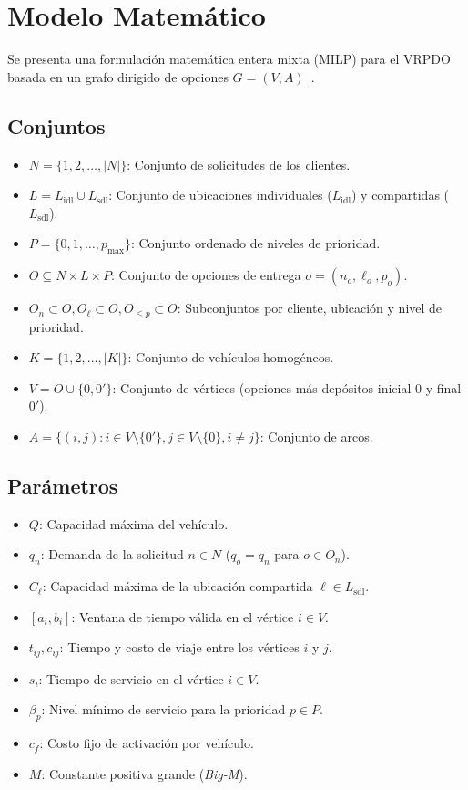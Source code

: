 \documentclass[letter, 10pt]{article}
\begin{document}
\section{Modelo Matemático} 
Se presenta una formulación matemática entera mixta (MILP) para el VRPDO basada en un grafo dirigido de opciones $G=(V, A)$~\cite{Dumez21Large, Tilk21LastMile, Yang25Neighborhood}. \subsection{Conjuntos} 
\begin{itemize} 
    \item $N = \{1, 2, \dots, |N|\}$: Conjunto de solicitudes de los clientes. \item $L = L_{\text{idl}} \cup L_{\text{sdl}}$: Conjunto de ubicaciones individuales ($L_{\text{idl}}$) y compartidas ($L_{\text{sdl}}$). 
    \item $P = \{0, 1, \dots, p_{\max}\}$: Conjunto ordenado de niveles de prioridad. 
    \item $O \subseteq N \times L \times P$: Conjunto de opciones de entrega $o = (n_o, \ell_o, p_o)$. 
    \item $O_n \subset O, O_\ell \subset O, O_{\le p} \subset O$: Subconjuntos por cliente, ubicación y nivel de prioridad. 
    \item $K = \{1, 2, \dots, |K|\}$: Conjunto de vehículos homogéneos. 
    \item $V = O \cup \{0, 0'\}$: Conjunto de vértices (opciones más depósitos inicial $0$ y final $0'$). 
    \item $A = \{(i, j) : i \in V \setminus \{0'\}, j \in V \setminus \{0\}, i \neq j\}$: Conjunto de arcos.
\end{itemize} 

\subsection{Parámetros} 
\begin{itemize} 
    \item $Q$: Capacidad máxima del vehículo. 
    \item $q_n$: Demanda de la solicitud $n \in N$ ($q_o = q_n$ para $o \in O_n$). 
    \item $C_\ell$: Capacidad máxima de la ubicación compartida $\ell \in L_{\text{sdl}}$. 
    \item $[a_i, b_i]$: Ventana de tiempo válida en el vértice $i \in V$. 
    \item $t_{ij}, c_{ij}$: Tiempo y costo de viaje entre los vértices $i$ y $j$. 
    \item $s_i$: Tiempo de servicio en el vértice $i \in V$.
    \item $\beta_p$: Nivel mínimo de servicio para la prioridad $p \in P$. 
    \item $c_f$: Costo fijo de activación por vehículo. 
    \item $M$: Constante positiva grande (\emph{Big-M}). 
\end{itemize} 
\end{document}
